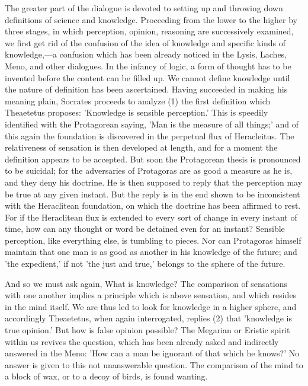 \documentclass[11pt,letter]{article}
\begin{document}
\par  The greater part of the dialogue is devoted to setting up and throwing down definitions of science and knowledge. Proceeding from the lower to the higher by three stages, in which perception, opinion, reasoning are successively examined, we first get rid of the confusion of the idea of knowledge and specific kinds of knowledge,—a confusion which has been already noticed in the Lysis, Laches, Meno, and other dialogues. In the infancy of logic, a form of thought has to be invented before the content can be filled up. We cannot define knowledge until the nature of definition has been ascertained. Having succeeded in making his meaning plain, Socrates proceeds to analyze (1) the first definition which Theaetetus proposes: 'Knowledge is sensible perception.' This is speedily identified with the Protagorean saying, 'Man is the measure of all things;' and of this again the foundation is discovered in the perpetual flux of Heracleitus. The relativeness of sensation is then developed at length, and for a moment the definition appears to be accepted. But soon the Protagorean thesis is pronounced to be suicidal; for the adversaries of Protagoras are as good a measure as he is, and they deny his doctrine. He is then supposed to reply that the perception may be true at any given instant. But the reply is in the end shown to be inconsistent with the Heraclitean foundation, on which the doctrine has been affirmed to rest. For if the Heraclitean flux is extended to every sort of change in every instant of time, how can any thought or word be detained even for an instant? Sensible perception, like everything else, is tumbling to pieces. Nor can Protagoras himself maintain that one man is as good as another in his knowledge of the future; and 'the expedient,' if not 'the just and true,' belongs to the sphere of the future.

\par  And so we must ask again, What is knowledge? The comparison of sensations with one another implies a principle which is above sensation, and which resides in the mind itself. We are thus led to look for knowledge in a higher sphere, and accordingly Theaetetus, when again interrogated, replies (2) that 'knowledge is true opinion.' But how is false opinion possible? The Megarian or Eristic spirit within us revives the question, which has been already asked and indirectly answered in the Meno: 'How can a man be ignorant of that which he knows?' No answer is given to this not unanswerable question. The comparison of the mind to a block of wax, or to a decoy of birds, is found wanting.
\end{document}

